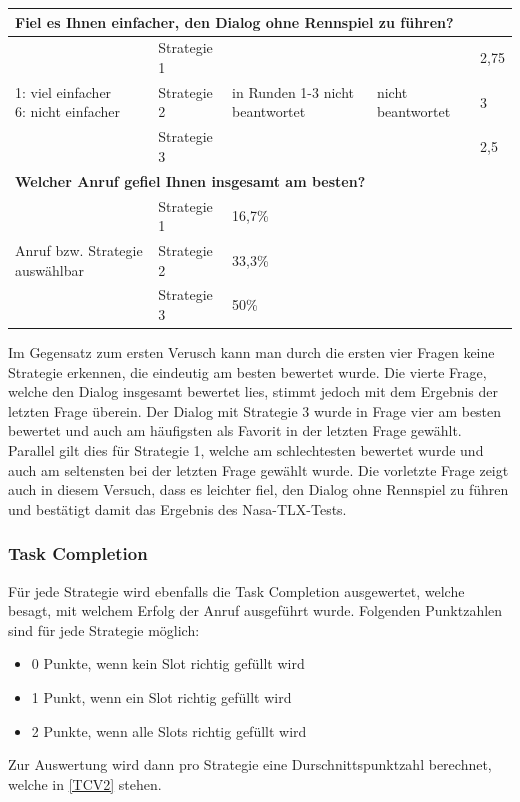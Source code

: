 \documentclass[12pt,a4paper]{scrartcl}
\begin{document}
\begin{longtable}{|p{4cm}|p{2cm}|p{2cm}|p{2cm}|p{2cm}|}
\hline
		\multicolumn{5}{l}{\textbf{Fiel es Ihnen einfacher, den Dialog ohne Rennspiel zu führen?}}\\
		\hline
\multirow{3}{4cm}{1: viel einfacher \newline  6: nicht einfacher} & Strategie 1 & \multirow{3}{2,5cm}{in Runden 1-3 nicht beantwortet} & \multirow{3}{2,5cm}{nicht beantwortet} & 2,75 \\
 & Strategie 2 & & & 3 \\
 & Strategie 3 & & & 2,5\\
\hline
		\multicolumn{5}{l}{\textbf{Welcher Anruf gefiel Ihnen insgesamt am besten?}}\\
		\hline
\multirow{3}{4cm}{Anruf bzw. Strategie auswählbar} & Strategie 1 & 16,7\% & & \\
 & Strategie 2 & 33,3\% && \\
 & Strategie 3 & 50\% && \\
\hline
\end{longtable}

Im Gegensatz zum ersten Verusch kann man durch die ersten vier Fragen keine Strategie erkennen, die eindeutig am besten bewertet wurde. Die vierte Frage, welche den Dialog insgesamt bewertet lies, stimmt jedoch mit dem Ergebnis der letzten Frage überein. Der Dialog mit Strategie 3 wurde in Frage vier am besten bewertet und auch am häufigsten als Favorit in der letzten Frage gewählt. Parallel gilt dies für Strategie 1, welche am schlechtesten bewertet wurde und auch am seltensten bei der letzten Frage gewählt wurde. Die vorletzte Frage zeigt auch in diesem Versuch, dass es leichter fiel, den Dialog ohne Rennspiel zu führen und bestätigt damit das Ergebnis des Nasa-TLX-Tests.

\subsubsection{Task Completion}
Für jede Strategie wird ebenfalls die Task Completion ausgewertet, welche besagt, mit welchem Erfolg der Anruf ausgeführt wurde. Folgenden Punktzahlen sind für jede Strategie möglich:
\begin{itemize}
\item 0 Punkte, wenn kein Slot richtig gefüllt wird
\item 1 Punkt, wenn ein Slot richtig gefüllt wird
\item 2 Punkte, wenn alle Slots richtig gefüllt wird
\end{itemize}
Zur Auswertung wird dann pro Strategie eine Durschnittspunktzahl berechnet, welche in \ref{TCV2} stehen. 
\end{document}
